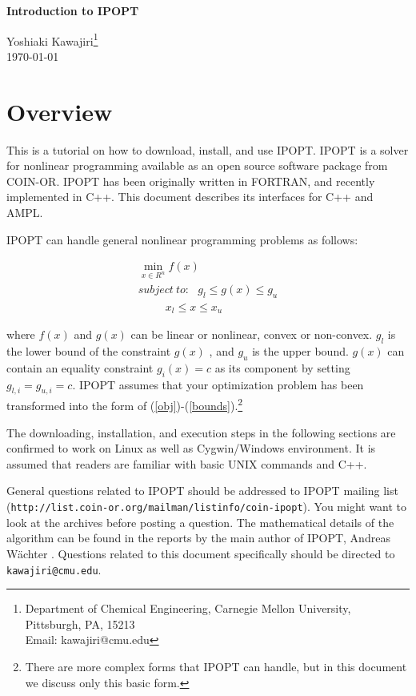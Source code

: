 \documentclass[letter,12pt]{article}
\begin{document}
\begin{center}
\begin{Large}
\textbf{Introduction to IPOPT}\\
\vspace{0.5cm}
\end{Large}
\end{center}
\begin{center}
Yoshiaki Kawajiri\footnote{
Department of Chemical Engineering, Carnegie Mellon University, Pittsburgh, PA, 15213\\
Email: kawajiri@cmu.edu}\\
\today
\end{center}
\section{Overview}
This is a tutorial on how to download, install, and use IPOPT.
IPOPT is a solver for nonlinear programming 
available as an open
 source software package from COIN-OR\cite{COINORWeb}.
 IPOPT has been originally written in FORTRAN, 
and recently implemented in C++. This document 
describes its interfaces for C++ and AMPL.\par
IPOPT can handle general nonlinear programming problems as follows:
\begin{center}
\begin{eqnarray}
\min_{x \in R^n} f(x) \label{obj}\\
subject~to:~~~ g_l \leq g(x) \leq g_u\\
~~~~~~~~~~~x_l \leq x \leq x_u \label{bounds}
\end{eqnarray}
\end{center}
where $f(x)$ and $g(x)$ can be linear or nonlinear, convex
or non-convex. $g_l$ is the lower bound of the constraint $g(x)$
, and $g_u$ is the upper bound. $g(x)$ can contain an equality constraint
$g_i(x)=c$ as its component by setting $g_{l,i}=g_{u,i}=c$.
IPOPT assumes that your optimization problem has been
 transformed into the form of (\ref{obj})-(\ref{bounds}).\footnote{There
 are more complex forms that IPOPT can handle, but in this document 
we discuss only this basic form.}\par
 The downloading, installation, and execution steps in the following
 sections are confirmed to work on Linux as well as Cygwin/Windows
environment. It is assumed that readers are
familiar with basic UNIX commands and C++.\par
General questions related to IPOPT should be addressed to IPOPT mailing
list ({\tt http://list.coin-or.org/mailman/listinfo/coin-ipopt}). You might
want to look at the archives before posting a question. The mathematical
details of the algorithm can be found in the
reports by the main author of IPOPT, Andreas W\"achter
\cite{AndreasPaper} \cite{AndreasThesis}.
 Questions related to this document specifically should be directed to 
{\tt kawajiri@cmu.edu}.
\end{document}
